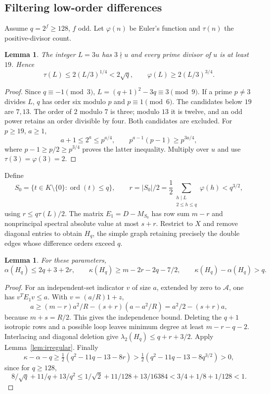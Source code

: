\documentclass[11pt]{article}
\newtheorem{lemma}[theorem]{Lemma}
\theoremstyle{definition}
\newcommand{\ord}{\operatorname{ord}}
\begin{document}
\subsection{Filtering low-order differences}
Assume $q=2^f\ge128$, $f$ odd. Let $\varphi(n)$ be Euler's function and $\tau(n)$ the positive-divisor count.
\begin{lemma}\label{lem:arithmetic}
The integer $L=3u$ has $3\nmid u$ and every prime divisor of $u$ is at least $19$. Hence
\[
\tau(L)\le2(L/3)^{1/4}<2\sqrt q,\qquad
\varphi(L)\ge2(L/3)^{3/4}.
\]
\end{lemma}
\begin{proof}
Since $q\equiv-1\pmod3$, $L=(q+1)^2-3q\equiv3\pmod9$. If a prime $p\ne3$ divides $L$, $q$ has order six modulo $p$ and $p\equiv1\pmod6$. The candidates below $19$ are $7,13$. The order of $2$ modulo $7$ is three; modulo $13$ it is twelve, and an odd power retains an order divisible by four. Both candidates are excluded. For $p\ge19$, $a\ge1$,
\[
a+1\le2^a\le p^{a/4},\qquad p^{a-1}(p-1)\ge p^{3a/4},
\]
where $p-1\ge p/2\ge p^{3/4}$ proves the latter inequality. Multiply over $u$ and use $\tau(3)=\varphi(3)=2$.
\end{proof}
Define
\[
S_0=\{t\in K\setminus\{0\}:\ord(t)\le q\},\qquad
r=|S_0|/2=\frac12\sum_{\substack{h\mid L\\2\le h\le q}}\varphi(h)<q^{3/2},
\]
using $r\le q\tau(L)/2$. The matrix $E_1=D-M_{S_0}$ has row sum $m-r$ and nonprincipal spectral absolute value at most $s+r$. Restrict to $X$ and remove diagonal entries to obtain $H_q$, the simple graph retaining precisely the double edges whose difference orders exceed $q$.
\begin{lemma}\label{lem:filtered}
For these parameters,
\[
\alpha(H_q)\le2q+3+2r,\qquad
\kappa(H_q)\ge m-2r-2q-7/2,\qquad
\kappa(H_q)-\alpha(H_q)>q.
\]
\end{lemma}
\begin{proof}
For an independent-set indicator $v$ of size $a$, extended by zero to $\mathcal A$, one has $v^TE_1v\le a$. With $v=(a/R)1+z$,
\[
a\ge(m-r)a^2/R-(s+r)(a-a^2/R)
=a^2/2-(s+r)a,
\]
because $m+s=R/2$. This gives the independence bound. Deleting the $q+1$ isotropic rows and a possible loop leaves minimum degree at least $m-r-q-2$. Interlacing and diagonal deletion give $\lambda_2(H_q)\le q+r+3/2$. Apply Lemma~\ref{lem:irregular}. Finally
\[
\kappa-\alpha-q\ge\tfrac12(q^2-11q-13-8r)
>\tfrac12(q^2-11q-13-8q^{3/2})>0,
\]
since for $q\ge128$,
\[
8/\sqrt q+11/q+13/q^2
\le1/\sqrt2+11/128+13/16384
<3/4+1/8+1/128<1.
\]
\end{proof}
\end{document}
